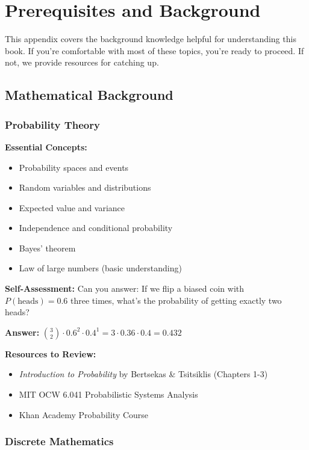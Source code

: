 \chapter{Prerequisites and Background}
\label{app:prerequisites}

This appendix covers the background knowledge helpful for understanding this book. If you're comfortable with most of these topics, you're ready to proceed. If not, we provide resources for catching up.

\section{Mathematical Background}

\subsection{Probability Theory}

\textbf{Essential Concepts:}
\begin{itemize}
\item Probability spaces and events
\item Random variables and distributions
\item Expected value and variance
\item Independence and conditional probability
\item Bayes' theorem
\item Law of large numbers (basic understanding)
\end{itemize}

\textbf{Self-Assessment:}
Can you answer: If we flip a biased coin with $P(\text{heads}) = 0.6$ three times, what's the probability of getting exactly two heads?

\textbf{Answer:} $\binom{3}{2} \cdot 0.6^2 \cdot 0.4^1 = 3 \cdot 0.36 \cdot 0.4 = 0.432$

\textbf{Resources to Review:}
\begin{itemize}
\item \textit{Introduction to Probability} by Bertsekas \& Tsitsiklis (Chapters 1-3)
\item MIT OCW 6.041 Probabilistic Systems Analysis
\item Khan Academy Probability Course
\end{itemize}

\subsection{Discrete Mathematics}

